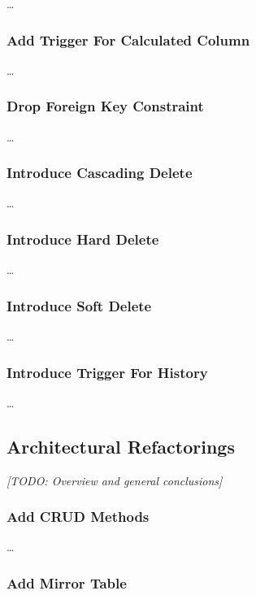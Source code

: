 \documentclass{acm_proc_article-sp}
\begin{document}
\ldots

\subsubsection{Add Trigger For Calculated Column}

\ldots

\subsubsection{Drop Foreign Key Constraint}

\ldots

\subsubsection{Introduce Cascading Delete}

\ldots

\subsubsection{Introduce Hard Delete}

\ldots

\subsubsection{Introduce Soft Delete}

\ldots

\subsubsection{Introduce Trigger For History}

\ldots


\subsection{Architectural Refactorings}

\textit{[TODO: Overview and general conclusions]}

\subsubsection{Add CRUD Methods}

\ldots

\subsubsection{Add Mirror Table}
\end{document}
